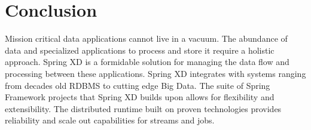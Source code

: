 \section{Conclusion}

Mission critical data applications cannot live in a vacuum. The abundance of data
and specialized applications to process and store it require a holistic approach.
Spring XD is a formidable solution for managing the data flow and processing
between these applications. Spring XD integrates with systems ranging from decades
old RDBMS to cutting edge Big Data. The suite of Spring Framework projects that
Spring XD builds upon allows for flexibility and extensibility. The distributed runtime
built on proven technologies provides reliability and scale out capabilities for streams
and jobs.
